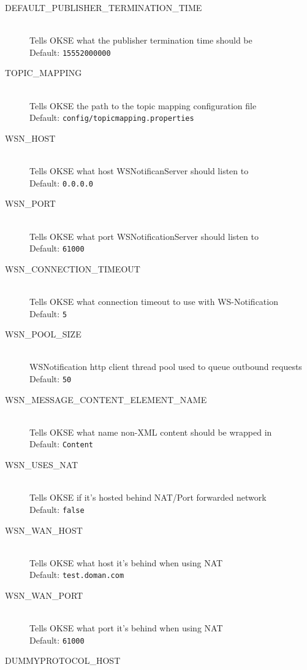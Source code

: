 \begin{description}
  \item[DEFAULT\_PUBLISHER\_TERMINATION\_TIME] \hfill \\
  Tells OKSE what the publisher termination time should be \hfill \\ Default: \verb!15552000000!
  \item[TOPIC\_MAPPING] \hfill \\
  Tells OKSE the path to the topic mapping configuration file \hfill \\ Default: \verb!config/topicmapping.properties!
  \item[WSN\_HOST] \hfill \\
  Tells OKSE what host WSNotificanServer should listen to \hfill \\ Default: \verb!0.0.0.0!
  \item[WSN\_PORT] \hfill \\
  Tells OKSE what port WSNotificationServer should listen to \hfill \\ Default: \verb!61000!
  \item[WSN\_CONNECTION\_TIMEOUT] \hfill \\
  Tells OKSE what connection timeout to use with WS-Notification \hfill \\ Default: \verb!5!
  \item[WSN\_POOL\_SIZE] \hfill \\
   WSNotification http client thread pool used to queue outbound requests \hfill \\ Default: \verb!50!
   \item[WSN\_MESSAGE\_CONTENT\_ELEMENT\_NAME] \hfill \\
  Tells OKSE what name non-XML content should be wrapped in \hfill \\ Default: \verb!Content!
  \item[WSN\_USES\_NAT] \hfill \\
  Tells OKSE if it's hosted behind NAT/Port forwarded network \hfill \\ Default: \verb!false!
  \item[WSN\_WAN\_HOST] \hfill \\
  Tells OKSE what host it's behind when using NAT \hfill \\ Default: \verb!test.doman.com!
  \item[WSN\_WAN\_PORT] \hfill \\
  Tells OKSE what port it's behind when using NAT \hfill \\ Default: \verb!61000!
  \item[DUMMYPROTOCOL\_HOST] \hfill \\

\end{description}
